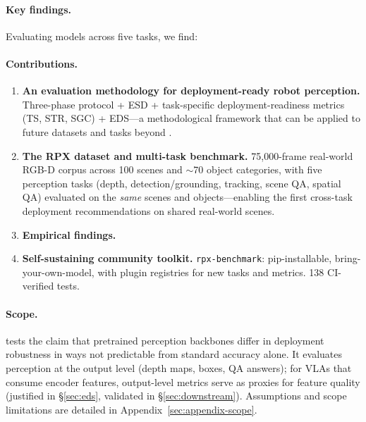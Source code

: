 \paragraph{Key findings.}
Evaluating  models across five tasks, we find:

\paragraph{Contributions.}
\begin{enumerate}[leftmargin=*, topsep=2pt, itemsep=1pt]
    \item \textbf{An evaluation methodology for deployment-ready robot perception.}
    Three-phase protocol + ESD + task-specific deployment-readiness metrics (TS, STR, SGC) + EDS---a methodological framework that can be applied to future datasets and tasks beyond \coolname{}.

    \item \textbf{The RPX dataset and multi-task benchmark.}
    75{,}000-frame real-world RGB-D corpus across 100 scenes and ${\sim}$70 object categories, with five perception tasks (depth, detection/grounding, tracking, scene QA, spatial QA) evaluated on the \textit{same} scenes and objects---enabling the first cross-task deployment recommendations on shared real-world scenes.

    \item \textbf{Empirical findings.}

    \item \textbf{Self-sustaining community toolkit.}
    \texttt{rpx-benchmark}: pip-installable, bring-your-own-model, with plugin registries for new tasks and metrics. 138 CI-verified tests.
\end{enumerate}

\paragraph{Scope.}
\coolname{} tests the claim that pretrained perception backbones differ in deployment robustness in ways not predictable from standard accuracy alone.
It evaluates perception at the output level (depth maps, boxes, QA answers); for VLAs that consume encoder features, output-level metrics serve as proxies for feature quality (justified in \S\ref{sec:eds}, validated in \S\ref{sec:downstream}).
Assumptions and scope limitations are detailed in Appendix~\ref{sec:appendix-scope}.
